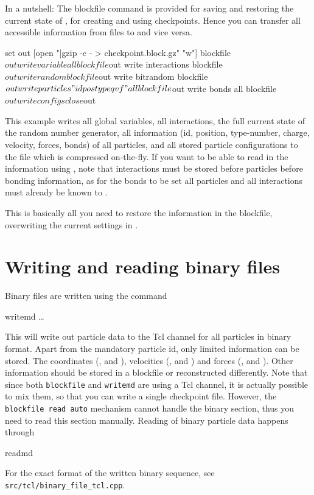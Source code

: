 In a nutshell: The blockfile command is provided for saving and
restoring the current state of \es, \eg for creating and using
checkpoints. Hence you can transfer all accessible information from
files to \es and vice versa.

\begin{tclcode}
set out [open "|gzip -c - > checkpoint.block.gz" "w"]
blockfile $out write variable all
blockfile $out write interactions
blockfile $out write random
blockfile $out write bitrandom
blockfile $out write particles "id pos type q v f" all
blockfile $out write bonds all
blockfile $out write configs
close $out 
\end{tclcode}

This example writes all global variables, all interactions, the full
current state of the random number generator, all information (\ie id,
position, type-number, charge, velocity, forces, bonds) of all
particles, and all stored particle configurations to the file
 which is compressed on-the-fly.  If you want
to be able to read in the information using \es, note that
interactions must be stored before particles before bonding
information, as for the bonds to be set all particles and all
interactions must already be known to \es.

This is basically all you need to restore the information in the
blockfile, overwriting the current settings in \es.

\section{Writing and reading binary files}

Binary files are written using the command
\begin{essyntax}
  writemd  \dots
\end{essyntax}
This will write out particle data to the Tcl channel  for
all particles in binary format. Apart from the mandatory particle id,
only limited information can be stored. The coordinates (,
 and ), velocities (,  and
) and forces (,  and ). Other
information should be stored in a blockfile or reconstructed
differently. Note that since both \texttt{blockfile} and
\texttt{writemd} are using a Tcl channel, it is actually possible to
mix them, so that you can write a single checkpoint file. However, the
\texttt{blockfile read auto} mechanism cannot handle the binary
section, thus you need to read this section manually. Reading of
binary particle data happens through
\begin{essyntax}
  readmd 
\end{essyntax}
For the exact format of the written binary sequence, see
\texttt{src/tcl/binary_file_tcl.cpp}.

